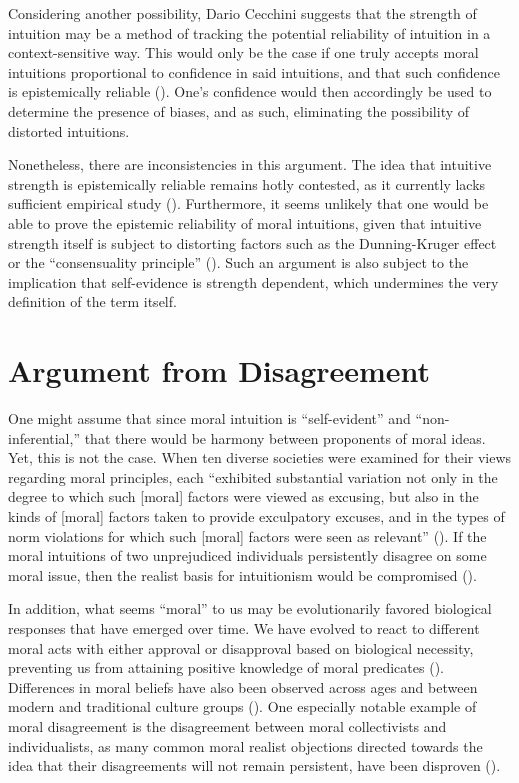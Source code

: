 Considering another possibility, Dario Cecchini suggests that the strength of intuition may be a method of tracking the potential reliability of intuition in a context-sensitive way. This would only be the case if one truly accepts moral intuitions proportional to confidence in said intuitions, and that such confidence is epistemically reliable (\cite[p.\ 11]{cecchini2024reliability}). One’s confidence would then accordingly be used to determine the presence of biases, and as such, eliminating the possibility of distorted intuitions. 

Nonetheless, there are inconsistencies in this argument. The idea that intuitive strength is epistemically reliable remains hotly contested, as it currently lacks sufficient empirical study (\cite[p.\ 22]{cecchini2024reliability}). Furthermore, it seems unlikely that one would be able to prove the epistemic reliability of moral intuitions, given that intuitive strength itself is subject to distorting factors such as the Dunning-Kruger effect or the “consensuality principle” (\cites[pp.\ 23–24]{cecchini2024reliability}[pp.\ 259–262]{dunning2011kruger}{koriat2012self}). Such an argument is also subject to the implication that self-evidence is strength dependent, which undermines the very definition of the term itself. 

\section{Argument from Disagreement}

One might assume that since moral intuition is “self-evident” and “non-inferential,” that there would be harmony between proponents of moral ideas. Yet, this is not the case. When ten diverse societies were examined for their views regarding moral principles, each “exhibited substantial variation not only in the degree to which such [moral] factors were viewed as excusing, but also in the kinds of [moral] factors taken to provide exculpatory excuses, and in the types of norm violations for which such [moral] factors were seen as relevant” (\cite[p.\ 4692]{barrett2016small}). If the moral intuitions of two unprejudiced individuals persistently disagree on some moral issue, then the realist basis for intuitionism would be compromised (\cites[pp.\ 208–210]{sidgwick1907methods}[p.\ 44]{shaferlandau2004good}).

In addition, what seems “moral” to us may be evolutionarily favored biological responses that have emerged over time. We have evolved to react to different moral acts with either approval or disapproval based on biological necessity, preventing us from attaining positive knowledge of moral predicates (\cites[p.\ 348]{singer2009ethics}[p.\ 72]{joyce2007evolution}{morton2016new}). Differences in moral beliefs have also been observed across ages and between modern and traditional culture groups (\cite{nisan1987moral}). One especially notable example of moral disagreement is the disagreement between moral collectivists and individualists, as many common moral realist objections directed towards the idea that their disagreements will not remain persistent, have been disproven (\cite[pp.\ 855–864]{goldman2022right}).

